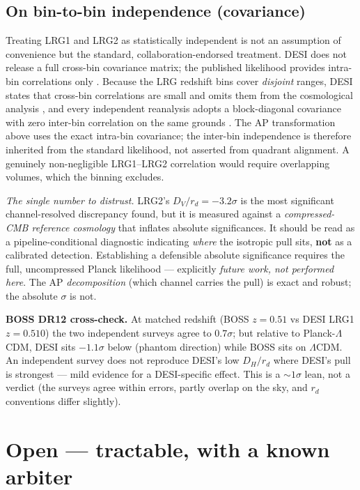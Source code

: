 \documentclass[11pt]{article}
\newcommand{\LCDM}{$\Lambda$CDM}
\newcommand{\rd}{\ensuremath{r_d}}
\newcommand{\Dhrd}{\ensuremath{D_H/r_d}}
\newcommand{\Dvrd}{\ensuremath{D_V/r_d}}
\begin{document}
\subsection{On bin-to-bin independence (covariance)}\label{sec:cov}

Treating LRG1 and LRG2 as statistically independent is not an assumption of convenience but the standard, collaboration-endorsed treatment. DESI does not release a full cross-bin covariance matrix; the published likelihood provides intra-bin correlations only \cite{desidr2}. Because the LRG redshift bins cover \emph{disjoint} ranges, DESI states that cross-bin correlations are small and omits them from the cosmological analysis \cite{desibao2024}, and every independent reanalysis adopts a block-diagonal covariance with zero inter-bin correlation on the same grounds \cite{omprior,rd}. The AP transformation above uses the exact intra-bin covariance; the inter-bin independence is therefore inherited from the standard likelihood, not asserted from quadrant alignment. A genuinely non-negligible LRG1--LRG2 correlation would require overlapping volumes, which the binning excludes.

\begin{caveatbox}
\textit{The single number to distrust.} LRG2's $\Dvrd=-3.2\sigma$ is the most significant channel-resolved discrepancy found, but it is measured against a \emph{compressed-CMB reference cosmology} that inflates absolute significances. It should be read as a pipeline-conditional diagnostic indicating \emph{where} the isotropic pull sits, \textbf{not} as a calibrated detection. Establishing a defensible absolute significance requires the full, uncompressed Planck likelihood --- explicitly \emph{future work, not performed here}. The AP \emph{decomposition} (which channel carries the pull) is exact and robust; the absolute $\sigma$ is not.
\end{caveatbox}

\textbf{BOSS DR12 cross-check.} At matched redshift (BOSS $z=0.51$ vs DESI LRG1 $z=0.510$) the two independent surveys agree to $0.7\sigma$; but relative to Planck-\LCDM, DESI sits $-1.1\sigma$ below (phantom direction) while BOSS sits on \LCDM. An independent survey does not reproduce DESI's low \Dhrd{} where DESI's pull is strongest --- mild evidence for a DESI-specific effect. This is a $\sim\!1\sigma$ lean, not a verdict (the surveys agree within errors, partly overlap on the sky, and \rd{} conventions differ slightly).

\section{Open --- tractable, with a known arbiter}
\end{document}
